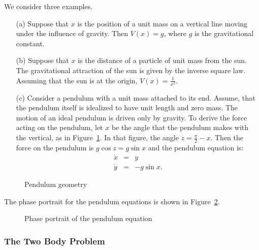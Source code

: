 \documentclass{ximera}
\begin{document}
We consider three examples.
\begin{itemize}
\item[(a)] Suppose that $x$ is the position of a unit mass on a vertical 
line moving under the influence of gravity.  Then $V(x)=g$, where 
$g$ is the gravitational constant.
\item[(b)] Suppose that $x$ is the distance of a particle of unit mass from 
the sun.  The gravitational attraction of the sun is given by the inverse
square law. Assuming that the sun is at the origin, $V(x)= \frac{1}{x^2}$.
\item[(c)] Consider a pendulum 
with a unit mass attached to its end.  Assume, 
that the pendulum itself is idealized to have unit length and zero mass.  
The motion of an ideal pendulum is driven only by gravity. To derive the 
force acting on the pendulum, let $x$ be the angle that the pendulum makes 
with the vertical, as in Figure~\ref{F:pendulum}.  In that figure, the angle
$z=\frac{\pi}{2}-x$.  Then the force on the pendulum is $g\cos z=g\sin x$ 
and the pendulum equation is:
\begin{equation*} \label{e:pendulum}
\begin{array}{rcl} 
\dot{x} & = & y \\
\dot{y} & = & -g\sin x. 
\end{array}
\end{equation*}
\end{itemize}
\begin{figure}[htb]
           \centerline{%
	   }
           \caption{Pendulum geometry}
           \label{F:pendulum}
\end{figure}
The phase portrait for the pendulum equations is shown in Figure~\ref{F:ppen}.
\begin{figure}[htb]
           \centerline{%
	   }
           \caption{Phase portrait of the pendulum equation 
		\protect{}}
           \label{F:ppen}
\end{figure}


\subsubsection*{The Two Body Problem}
\end{document}
